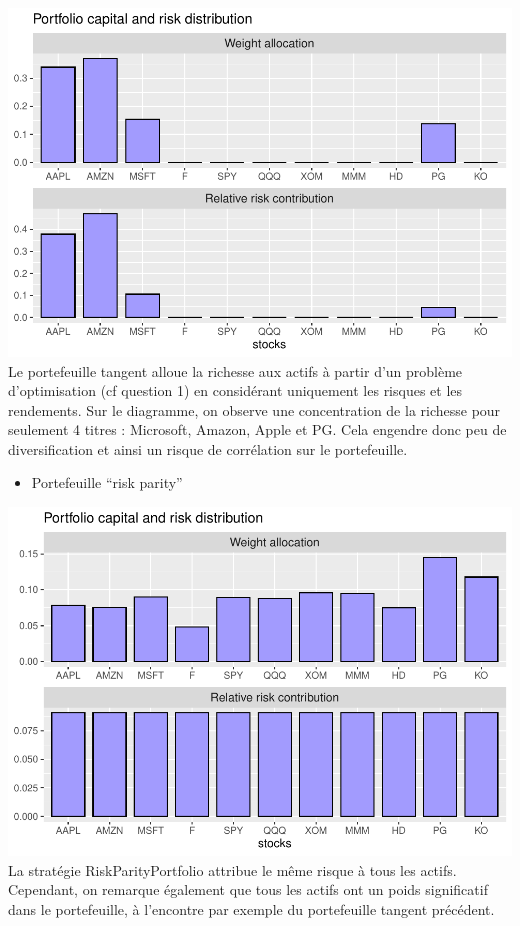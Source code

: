 \documentclass[
]{article}
\newenvironment{Shaded}{\begin{snugshade}}{\end{snugshade}}
\newcommand{\AttributeTok}[1]{\textcolor[rgb]{0.77,0.63,0.00}{#1}}
\newcommand{\FunctionTok}[1]{\textcolor[rgb]{0.00,0.00,0.00}{#1}}
\newcommand{\NormalTok}[1]{#1}
\newcommand{\OtherTok}[1]{\textcolor[rgb]{0.56,0.35,0.01}{#1}}
\newcommand{\SpecialCharTok}[1]{\textcolor[rgb]{0.00,0.00,0.00}{#1}}
\newcommand{\StringTok}[1]{\textcolor[rgb]{0.31,0.60,0.02}{#1}}
\providecommand{\tightlist}{%
  \setlength{\itemsep}{0pt}\setlength{\parskip}{0pt}}
\begin{document}
\includegraphics{TP-7-v2_files/figure-latex/unnamed-chunk-7-1.pdf} Le
portefeuille tangent alloue la richesse aux actifs à partir d'un
problème d'optimisation (cf question 1) en considérant uniquement les
risques et les rendements. Sur le diagramme, on observe une
concentration de la richesse pour seulement 4 titres : Microsoft,
Amazon, Apple et PG. Cela engendre donc peu de diversification et ainsi
un risque de corrélation sur le portefeuille.

\begin{itemize}
\tightlist
\item
  Portefeuille ``risk parity''
\end{itemize}

\begin{Shaded}
\end{Shaded}

\includegraphics{TP-7-v2_files/figure-latex/unnamed-chunk-8-1.pdf} La
stratégie RiskParityPortfolio attribue le même risque à tous les actifs.
Cependant, on remarque également que tous les actifs ont un poids
significatif dans le portefeuille, à l'encontre par exemple du
portefeuille tangent précédent.
\end{document}
